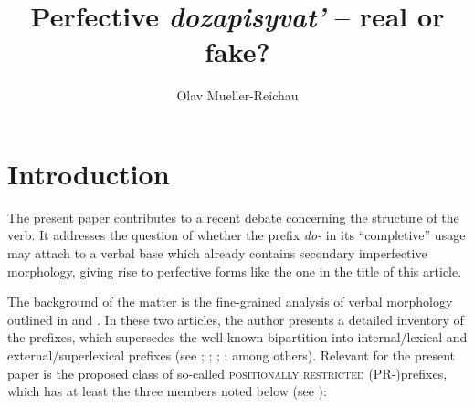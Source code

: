 \documentclass[output=paper,
colorlinks,
citecolor=brown,
newtxmath
]{langscibook}
\author{Olav Mueller-Reichau\affiliation{Leipzig University}}
\title{Perfective \textit{dozapisyvat'} -- real or fake?}
\begin{document}
\maketitle


\section{Introduction}

The present paper contributes to a recent debate concerning the structure of the  verb. It addresses the question of whether the prefix \textit{do-} in its ``completive'' usage may attach to a verbal base which already contains secondary imperfective morphology, giving rise to perfective forms like the one in the title of this article.

The background of the matter is the fine-grained analysis of  verbal morphology outlined in \citet{Tatevosov2009} and \citet{Tatevosov2013b}. In these two articles, the author presents a detailed inventory of the  prefixes, which supersedes the well-known bipartition into internal/lexical and external/super\-lexical pre\-fixes (see \citealt{Gehrke2008}; \citealt{Ramchand2004}; \citealt{Romanova2004}; \citealt{Svenonius2004}; among others). Relevant for the present paper is the proposed class of so-called \textsc{positionally restricted} (PR-)prefixes, which has at least the three members noted below (see \citealt[49]{Tatevosov2013b}):
\end{document}
